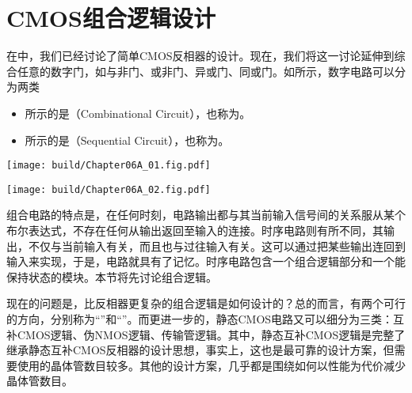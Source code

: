 \chapter{CMOS组合逻辑设计}
在中，我们已经讨论了简单CMOS反相器的设计。现在，我们将这一讨论延伸到综合任意的数字门，如与非门、或非门、异或门、同或门。如所示，数字电路可以分为两类
\begin{itemize}
    \item {}所示的是（Combinational Circuit），也称为。
    \item {}所示的是（Sequential Circuit），也称为。
\end{itemize}

\begin{Figure}[数字电路的高层次分类]
    \begin{FigureSub}[组合电路]
        \texttt{[image: build/Chapter06A\_01.fig.pdf]}
    \end{FigureSub}
    \hspace{1cm}
    \begin{FigureSub}[时序电路]
        \texttt{[image: build/Chapter06A\_02.fig.pdf]}
    \end{FigureSub}
\end{Figure}
组合电路的特点是，在任何时刻，电路输出都与其当前输入信号间的关系服从某个布尔表达式，不存在任何从输出返回至输入的连接。时序电路则有所不同，其输出，不仅与当前输入有关，而且也与过往输入有关。这可以通过把某些输出连回到输入来实现，于是，电路就具有了记忆。时序电路包含一个组合逻辑部分和一个能保持状态的模块。本节将先讨论组合逻辑。

现在的问题是，比反相器更复杂的组合逻辑是如何设计的？总的而言，有两个可行的方向，分别称为“”和“”。而更进一步的，静态CMOS电路又可以细分为三类：互补CMOS逻辑、伪NMOS逻辑、传输管逻辑。其中，静态互补CMOS逻辑是完整了继承静态互补CMOS反相器的设计思想，事实上，这也是最可靠的设计方案，但需要使用的晶体管数目较多。其他的设计方案，几乎都是围绕如何以性能为代价减少晶体管数目。



